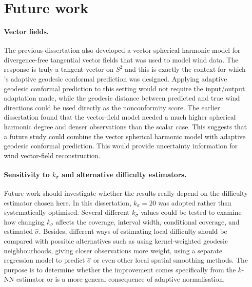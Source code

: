 \documentclass[11pt,a4paper]{report}
\begin{document}
\section{Future work}

\paragraph{Vector fields.} The previous dissertation also developed a vector spherical harmonic model for divergence-free tangential vector fields that was used to model wind data. The response is truly a tangent vector on $S^2$ and this is exactly the context for which \citeauthor{amirishahbazi2026}'s adaptive geodesic conformal prediction was designed. Applying adaptive geodesic conformal prediction to this setting would not require the input/output adaptation made, while the geodesic distance between predicted and true wind directions could be used directly as the nonconformity score. The earlier dissertation found that the vector-field model needed a much higher spherical harmonic degree and denser observations than the scalar case. This suggests that a future study could combine the vector spherical harmonic model with adaptive geodesic conformal prediction. This would provide uncertainty information for wind vector-field reconstruction. 
 
\paragraph{Sensitivity to $k_\sigma$ and alternative difficulty estimators.} Future work should investigate whether the results really depend on the difficulty estimator chosen here. In this dissertation, $k_\sigma=20$ was adopted rather than systematically optimised. Several different $k_\sigma$ values could be tested to examine how changing $k_\sigma$ affects the coverage, interval width, conditional coverage, and estimated $\hat\sigma$. Besides, different ways of estimating local difficulty should be compared with possible alternatives such as using kernel-weighted geodesic neighbourhoods, giving closer observations more weight, using  a separate regression model to predict  $\hat\sigma$ or even other local spatial smoothing methods. The purpose is to determine whether the improvement comes specifically from the $k$-NN estimator or is a more general consequence of adaptive normalisation.
\end{document}
